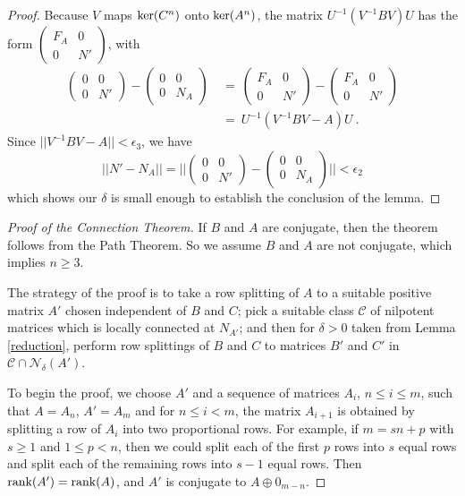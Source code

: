 \documentclass{amsart}
\theoremstyle{definition}
\theoremstyle{remark}
\numberwithin{equation}{section}
\begin{document}
{{\begin{proof}
Because $V$ maps $\textnormal{ker}(C^n)$ onto $\textnormal{ker}(A^n)$, 
the matrix 
$U^{-1}(V^{-1}BV)U$ has the form 
$\left(
\begin{smallmatrix} F_A & 0 \\ 0 & N' 
\end{smallmatrix}
\right) $, with 
\begin{align*} 
\begin{pmatrix} 0 & 0 \\ 0 & N' 
\end{pmatrix} 
- 
\begin{pmatrix} 0 & 0 \\ 0 & N_A 
\end{pmatrix} 
\ &= \ 
\begin{pmatrix} F_A & 0 \\ 0 & N' 
\end{pmatrix} 
-
\begin{pmatrix} F_A & 0 \\ 0 & N' 
\end{pmatrix} 
\\ 
&= \
 U^{-1}(V^{-1}BV-A)U
\ . 
\end{align*} 
Since $|| V^{-1}BV - A||<\epsilon_3$, we have 
\[
||N'-N_A||= 
\Bigg|\Bigg|
\begin{pmatrix} 0 & 0 \\ 0 & N' 
\end{pmatrix} 
- 
\begin{pmatrix} 0 & 0 \\ 0 & N_A 
\end{pmatrix} 
\Bigg|\Bigg|
< \epsilon_2
\] 
which shows  our $\delta $ is small enough 
to establish the conclusion of the lemma. 
\end{proof}

\begin{proof}
[Proof of the Connection Theorem]
If $B$ and $A$ are conjugate, then the theorem follows 
from the Path Theorem. So we assume $B$ and $A$ are 
not conjugate, which implies $n\geq 3$. 

The strategy of the proof is to take a row splitting of 
$A$ to a suitable positive matrix $A'$ chosen independent of $B$ and $C$; 
pick a suitable class $\mathcal C$ of nilpotent matrices 
which is locally connected at $N_{A'}$; and then for 
 $\delta >0  $ taken from Lemma \ref{reduction}, 
perform  row splittings of $B$ and $C$ 
to matrices $B'$ and $C'$ in $\mathcal C\cap \mathcal N_{\delta}(A')$. 

To begin the proof, we choose 
$A'$ and a sequence of matrices 
$A_i$, 
$n\leq i\leq m$, such that  $A=A_n$, $A'=A_m$ 
and for $n\leq i < m$, the matrix $A_{i+1}$ 
is obtained by splitting a row of $A_i$ 
into two proportional rows. 
 For example, if $m=sn+p$ with 
$s\geq 1 $ and $1\leq p <n$, then we could split 
each of the first $p$ rows into $s$ equal rows and split 
each of the remaining rows into $s-1$ equal rows. 
Then $\textnormal{rank}(A')=
\textnormal{rank}(A)$, and  $A'$ is conjugate to 
$A\oplus 0_{m-n}$. 


\end{proof}}}
\end{document}
